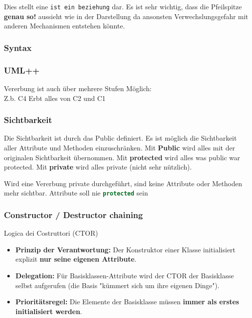 Dies stellt eine \texttt{ist ein beziehung} dar. 
Es ist sehr wichtig, dass die Pfeilspitze \colorbox{red!65}{\textbf{genau so!}} aussieht wie in der Darstellung da ansonsten Verwechslungsgefahr mit anderen Mechanismen entstehen könnte.
\subsubsection{Syntax}



\subsubsection{UML++}


\hfill
\begin{minipage}[b]{0.45\columnwidth}
    Vererbung ist auch über mehrere Stufen Möglich:\\
    Z.b. C4 Erbt alles von C2 und C1
\end{minipage}

\subsubsection{Sichtbarkeit}

Die Sichtbarkeit ist durch das Public definiert. 
Es ist möglich die Sichtbarkeit aller Attribute und Methoden einzuschränken. 
Mit \textbf{Public} wird alles mit der originalen Sichtbarkeit übernommen. 
Mit \textbf{protected} wird alles was public war protected. 
Mit \textbf{private} wird alles private (nicht sehr nützlich). 
\resizebox{\columnwidth}{!}{  
    
}

Wird eine Vererbung private durchgeführt, sind keine Attribute oder Methoden mehr sichtbar.
Attribute soll nie \lstinline[language=C++]|protected| sein
\subsubsection{Constructor / Destructor chaining}

\par{Logica dei Costruttori (CTOR)}
\begin{itemize}
    \item \textbf{Prinzip der Verantwortung:} Der Konstruktor einer Klasse initialisiert explizit \textbf{nur seine eigenen Attribute}.
    \item \textbf{Delegation:} Für Basisklassen-Attribute wird der CTOR der Basisklasse selbst aufgerufen (die Basis "kümmert sich um ihre eigenen Dinge").
    \item \textbf{Prioritätsregel:} Die Elemente der Basisklasse müssen \textbf{immer als erstes initialisiert werden}.
\end{itemize}


